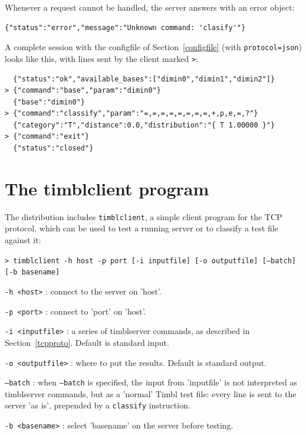 \documentclass{report}
\begin{document}
Whenever a request cannot be handled, the server answers with an error
object:

\begin{verbatim}
{"status":"error","message":"Unknown command: 'clasify'"}
\end{verbatim}

A complete session with the configfile of Section~\ref{configfile}
(with {\tt protocol=json}) looks like this, with lines sent by the
client marked {\tt >}:

\begin{footnotesize}
\begin{verbatim}
  {"status":"ok","available_bases":["dimin0","dimin1","dimin2"]}
> {"command":"base","param":"dimin0"}
  {"base":"dimin0"}
> {"command":"classify","param":"=,=,=,=,=,=,=,=,+,p,e,=,?"}
  {"category":"T","distance":0.0,"distribution":"{ T 1.00000 }"}
> {"command":"exit"}
  {"status":"closed"}
\end{verbatim}
\end{footnotesize}

\chapter{The timblclient program}
\label{client}

The distribution includes {\tt timblclient}, a simple client program
for the TCP protocol, which can be used to test a running server or to
classify a test file against it:

{\tt > timblclient -h host -p port [-i inputfile] [-o outputfile]
  [--batch] [-b basename]}

\begin{description}
\item {\tt -h <host>} : connect to the server on 'host'.
\item {\tt -p <port>} : connect to 'port' on 'host'.
\item {\tt -i <inputfile>} : a series of timblserver commands, as
  described in Section~\ref{tcpproto}. Default is standard input.
\item {\tt -o <outputfile>} : where to put the results. Default is
  standard output.
\item {\tt --batch} : when {\tt --batch} is specified, the input from
  'inputfile' is not interpreted as timblserver commands, but as a
  'normal' Timbl test file: every line is sent to the server 'as is',
  prepended by a {\tt classify} instruction.
\item {\tt -b <basename>} : select 'basename' on the server before
  testing.
\end{description}
\end{document}
